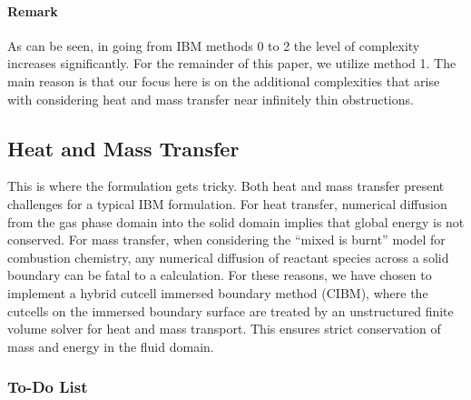 \documentclass[12pt]{article}
\begin{document}
\paragraph{Remark} As can be seen, in going from IBM methods 0 to 2 the level of complexity increases significantly.  For the remainder of this paper, we utilize method 1.  The main reason is that our focus here is on the additional complexities that arise with considering heat and mass transfer near infinitely thin obstructions.

%

\subsection{Heat and Mass Transfer}

This is where the formulation gets tricky.  Both heat and mass transfer present challenges for a typical IBM formulation.  For heat transfer, numerical diffusion from the gas phase domain into the solid domain implies that global energy is not conserved.  For mass transfer, when considering the ``mixed is burnt'' model for combustion chemistry, any numerical diffusion of reactant species across a solid boundary can be fatal to a calculation.  For these reasons, we have chosen to implement a hybrid cutcell immersed boundary method (CIBM), where the cutcells on the immersed boundary surface are treated by an unstructured finite volume solver for heat and mass transport.  This ensures strict conservation of mass and energy in the fluid domain.

\subsubsection{To-Do List}
\end{document}
